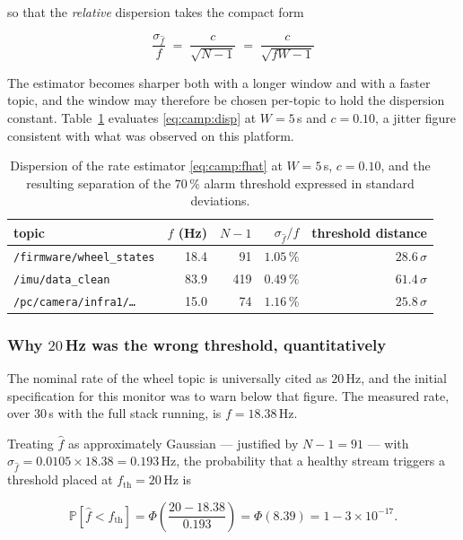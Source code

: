 so that the \emph{relative} dispersion takes the compact form

\begin{equation}
  \boxed{\;
  \frac{\sigma_{\hat f}}{f} \;=\; \frac{c}{\sqrt{N-1}}
  \;=\; \frac{c}{\sqrt{fW-1}} \;}
  \label{eq:camp:disp}
\end{equation}

The estimator becomes sharper both with a longer window and with a faster
topic, and the window may therefore be chosen per-topic to hold the dispersion
constant. Table~\ref{tab:camp:disp} evaluates \eqref{eq:camp:disp} at
$W = 5$\,s and $c = 0.10$, a jitter figure consistent with what was observed
on this platform.

\begin{table}[htbp]
\centering
\caption{Dispersion of the rate estimator \eqref{eq:camp:fhat} at $W=5$\,s,
$c=0.10$, and the resulting separation of the $70\,\%$ alarm threshold
expressed in standard deviations.}
\label{tab:camp:disp}
\begin{tabular}{lrrrr}
\toprule
topic & $f$ (Hz) & $N-1$ & $\sigma_{\hat f}/f$ & threshold distance \\
\midrule
\texttt{/firmware/wheel\_states} & 18.4 & 91  & $1.05\,\%$ & $28.6\,\sigma$ \\
\texttt{/imu/data\_clean}        & 83.9 & 419 & $0.49\,\%$ & $61.4\,\sigma$ \\
\texttt{/pc/camera/infra1/\dots} & 15.0 & 74  & $1.16\,\%$ & $25.8\,\sigma$ \\
\bottomrule
\end{tabular}
\end{table}

\subsubsection{Why $20$\,Hz was the wrong threshold, quantitatively}

The nominal rate of the wheel topic is universally cited as $20$\,Hz, and the
initial specification for this monitor was to warn below that figure. The
measured rate, over $30$\,s with the full stack running, is
$f = 18.38$\,Hz.

Treating $\hat f$ as approximately Gaussian --- justified by
$N-1 = 91$ --- with $\sigma_{\hat f} = 0.0105 \times 18.38 = 0.193$\,Hz, the
probability that a healthy stream triggers a threshold placed at
$f_{\mathrm{th}} = 20$\,Hz is

\begin{equation}
  \mathbb{P}\!\left[\hat f < f_{\mathrm{th}}\right]
  = \Phi\!\left(\frac{20 - 18.38}{0.193}\right)
  = \Phi(8.39)
  = 1 - 3\times10^{-17}.
  \label{eq:camp:faux}
\end{equation}

